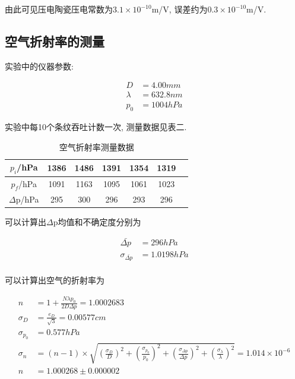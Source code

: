 \documentclass[a4paper,10pt,notitlepage]{article}
\begin{document}
	由此可见压电陶瓷压电常数为$3.1 \times 10^{-10}$m/V, 误差约为$0.3 \times 10^{-10}$m/V.
	
\subsection{空气折射率的测量}

	实验中的仪器参数:
	
\begin{align*}
	D &= 4.00mm \\
	\lambda &= 632.8nm \\
	p_0 &= 1004 hPa
\end{align*}

	实验中每10个条纹吞吐计数一次, 测量数据见表二.

\begin{center}

	\begin{longtable}{|c|c|c|c|c|c|c|}
	\caption{空气折射率测量数据} \\
	\hline
	$p_i$/hPa & 1386 & 1486 & 1391 & 1354 & 1319 \\
	\hline
	$p_f$/hPa & 1091 & 1163 & 1095 & 1061 & 1023 \\
	\hline
	$\Delta$p/hPa & 295 & 300 & 296 & 293 & 296 \\
	\hline
	\end{longtable}

\end{center}

	可以计算出$\Delta$p均值和不确定度分别为
	
\begin{align*}
	\bar{\Delta p} &= 296 hPa \\
	\sigma_{\bar{\Delta p}} &= 1.0198 hPa \\
\end{align*}

	可以计算出空气的折射率为
	
\begin{align*}
	n &= 1 + \frac{N\lambda p_0}{2D\Delta p} = 1.0002683 \\
	\sigma_D &= \frac{e_D}{\sqrt{3}} = 0.00577 cm \\
	\sigma_{p_0} &= 0.577hPa \\
	\sigma_n &= (n - 1) \times \sqrt{(\frac{\sigma_D}{D})^2 + (\frac{\sigma_{p_0}}{p_0})^2 + (\frac{\sigma_{\Delta p}}{\Delta p})^2 + (\frac{\sigma_{\lambda}}{\lambda})^2} = 1.014 \times 10^{-6} \\
	n &= 1.000268 \pm 0.000002
\end{align*}
\end{document}
